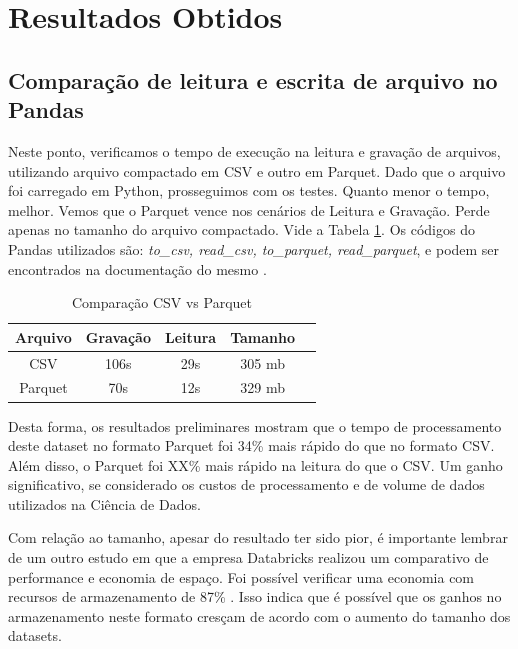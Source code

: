 \section{Resultados Obtidos}

\subsection{Comparação de leitura e escrita de arquivo no Pandas}

Neste ponto, verificamos o tempo de execução na leitura e gravação de arquivos, utilizando arquivo compactado em CSV e outro em Parquet. Dado que o arquivo foi carregado em Python, prosseguimos com os testes. Quanto menor o tempo, melhor. Vemos que o Parquet vence nos cenários de Leitura e Gravação. Perde apenas no tamanho do arquivo compactado. Vide a Tabela \ref{tab1}. Os códigos do Pandas utilizados são: \textit{to\_csv, read\_csv, to\_parquet, read\_parquet}, e podem ser encontrados na documentação do mesmo \cite{PandasDocumentation}.

\begin{table}[htbp]
	\caption{Comparação CSV vs Parquet}
	\begin{center}
		\begin{tabular}{|c|c|c|c|c|}
			\hline
			\textbf{Arquivo} & \textbf{Gravação} & \textbf{Leitura} & \textbf{Tamanho} \\
			\hline
			CSV              & 106s                & 29s              & 305 mb           \\
			\hline
			Parquet          & 70s                 & 12s              & 329 mb           \\
			\hline
		\end{tabular}
		\label{tab1}
	\end{center}
\end{table}

Desta forma, os resultados preliminares mostram que o tempo de processamento deste dataset no formato Parquet foi 34\% mais rápido do que no formato CSV. Além disso, o Parquet foi XX\% mais rápido na leitura do que o CSV. Um ganho significativo, se considerado os custos de processamento e de volume de dados utilizados na Ciência de Dados.

Com relação ao tamanho, apesar do resultado ter sido pior, é importante lembrar de um outro estudo em que a empresa Databricks realizou um comparativo de performance e economia de espaço. Foi possível verificar uma economia com recursos de armazenamento de 87\% \cite{Databricks}. Isso indica que é possível que os ganhos no armazenamento neste formato cresçam de acordo com o aumento do tamanho dos datasets.
	
